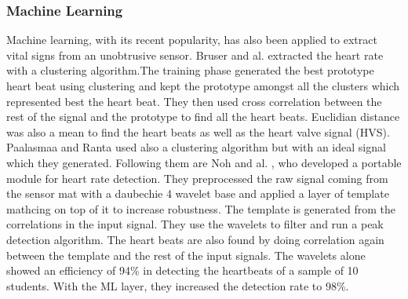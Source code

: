 \documentclass[twoside,twocolumn]{article}
\begin{document}
		\subsubsection{Machine Learning}
		Machine learning, with its recent popularity, has also been applied to extract vital signs from an unobtrusive sensor.
		Bruser and al. \cite{bruser_adaptive_2011} extracted the heart rate with a clustering algorithm.The training phase generated the best prototype heart beat using clustering and kept the prototype amongst all the clusters which represented best the heart beat. They then used cross correlation between the rest of the signal and the prototype to find all the heart beats. Euclidian distance was also a mean to find the heart beats as well as the heart valve signal (HVS). 
		Paalasmaa and Ranta \cite{paalasmaa_detecting_2008} used also a clustering algorithm but with an ideal signal which they generated. 
		Following them are Noh and al. \cite{noh_development_2010}, who developed a portable module for heart rate detection. They preprocessed the raw signal coming from the sensor mat with a daubechie 4 wavelet base and applied a layer of template mathcing on top of it to increase robustness. The template is generated from the correlations in the input signal. They use the wavelets to filter and run a peak detection algorithm. The heart beats are also found by doing correlation again between the template and the rest of the input signals. The wavelets alone showed an efficiency of 94\% in detecting the heartbeats of a sample of 10 students. With the ML layer, they increased the detection rate to 98\%. 
		
\end{document}

